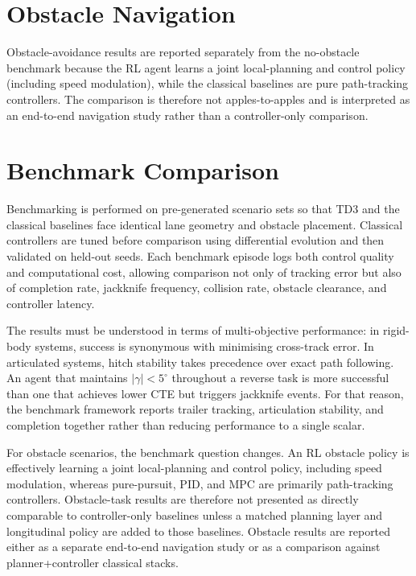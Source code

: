 \section{Obstacle Navigation}
\label{sec:obstacle_results}

Obstacle-avoidance results are reported separately from the no-obstacle benchmark because the RL agent learns a joint local-planning and control policy (including speed modulation), while the classical baselines are pure path-tracking controllers. The comparison is therefore not apples-to-apples and is interpreted as an end-to-end navigation study rather than a controller-only comparison.



\section{Benchmark Comparison}


Benchmarking is performed on pre-generated scenario sets so that TD3 and the classical baselines face identical lane geometry and obstacle placement. Classical controllers are tuned before comparison using differential evolution and then validated on held-out seeds. Each benchmark episode logs both control quality and computational cost, allowing comparison not only of tracking error but also of completion rate, jackknife frequency, collision rate, obstacle clearance, and controller latency.

The results must be understood in terms of multi-objective performance: in rigid-body systems, success is synonymous with minimising cross-track error. In articulated systems, hitch stability takes precedence over exact path following. An agent that maintains $|\gamma| < 5^\circ$ throughout a reverse task is more successful than one that achieves lower CTE but triggers jackknife events. For that reason, the benchmark framework reports trailer tracking, articulation stability, and completion together rather than reducing performance to a single scalar.

For obstacle scenarios, the benchmark question changes. An RL obstacle policy is effectively learning a joint local-planning and control policy, including speed modulation, whereas pure-pursuit, PID, and MPC are primarily path-tracking controllers. Obstacle-task results are therefore not presented as directly comparable to controller-only baselines unless a matched planning layer and longitudinal policy are added to those baselines. Obstacle results are reported either as a separate end-to-end navigation study or as a comparison against planner+controller classical stacks.

